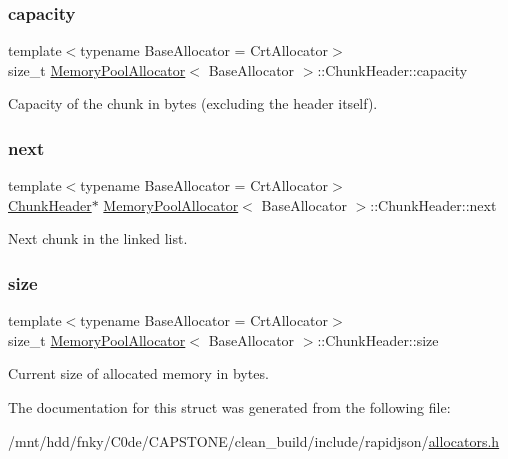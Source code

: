 \subsubsection{\texorpdfstring{capacity}{capacity}}
{\footnotesize\ttfamily template$<$typename Base\+Allocator = Crt\+Allocator$>$ \\
size\+\_\+t \hyperlink{classMemoryPoolAllocator}{Memory\+Pool\+Allocator}$<$ Base\+Allocator $>$\+::Chunk\+Header\+::capacity}



Capacity of the chunk in bytes (excluding the header itself). 

\mbox{\label{structMemoryPoolAllocator_1_1ChunkHeader_a4d24357c177824b3af56ec1098d9d9dc}} 
\subsubsection{\texorpdfstring{next}{next}}
{\footnotesize\ttfamily template$<$typename Base\+Allocator = Crt\+Allocator$>$ \\
\hyperlink{structMemoryPoolAllocator_1_1ChunkHeader}{Chunk\+Header}$\ast$ \hyperlink{classMemoryPoolAllocator}{Memory\+Pool\+Allocator}$<$ Base\+Allocator $>$\+::Chunk\+Header\+::next}



Next chunk in the linked list. 

\mbox{\label{structMemoryPoolAllocator_1_1ChunkHeader_ac9f3868f4cd36cdb7c712c9a48686680}} 
\subsubsection{\texorpdfstring{size}{size}}
{\footnotesize\ttfamily template$<$typename Base\+Allocator = Crt\+Allocator$>$ \\
size\+\_\+t \hyperlink{classMemoryPoolAllocator}{Memory\+Pool\+Allocator}$<$ Base\+Allocator $>$\+::Chunk\+Header\+::size}



Current size of allocated memory in bytes. 



The documentation for this struct was generated from the following file\+:\begin{DoxyCompactItemize}
\item 
/mnt/hdd/fnky/\+C0de/\+C\+A\+P\+S\+T\+O\+N\+E/clean\+\_\+build/include/rapidjson/\hyperlink{allocators_8h}{allocators.\+h}\end{DoxyCompactItemize}
